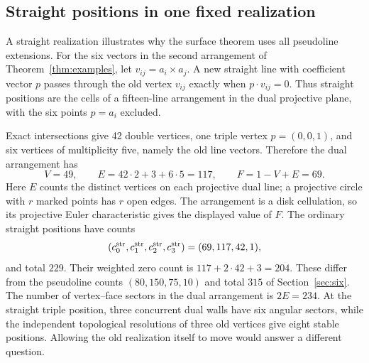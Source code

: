 \subsection{Straight positions in one fixed realization}
A straight realization illustrates why the surface theorem uses all
pseudoline extensions. For the six vectors in the second arrangement
of Theorem~\ref{thm:examples}, let $v_{ij}=a_i\times a_j$.
A new straight line with coefficient vector $p$ passes through the
old vertex $v_{ij}$ exactly when $p\cdot v_{ij}=0$.
Thus straight positions are the cells of a fifteen-line arrangement
in the dual projective plane, with the six points $p=a_i$ excluded.

Exact intersections give 42 double vertices, one triple vertex
$p=(0,0,1)$, and six vertices of multiplicity five, namely the old
line vectors. Therefore the dual arrangement has
\[
 V=49,\qquad E=42\cdot2+3+6\cdot5=117,\qquad
 F=1-V+E=69.
\]
Here $E$ counts the distinct vertices on each projective dual line;
a projective circle with $r$ marked points has $r$ open edges.
The arrangement is a disk cellulation, so its projective Euler
characteristic gives the displayed value of $F$.
The ordinary straight positions have counts
\[
 (c_0^{\rm str},c_1^{\rm str},c_2^{\rm str},c_3^{\rm str})
       =(69,117,42,1),
\]
and total $229$. Their weighted zero count is
$117+2\cdot42+3=204$. These differ from the pseudoline counts
$(80,150,75,10)$ and total $315$ of Section~\ref{sec:six}.
The number of vertex--face sectors in the dual arrangement is
$2E=234$.
At the straight triple position, three concurrent dual walls have
six angular sectors, while the independent topological resolutions
of three old vertices give eight stable positions. Allowing the old
realization itself to move would answer a different question.

